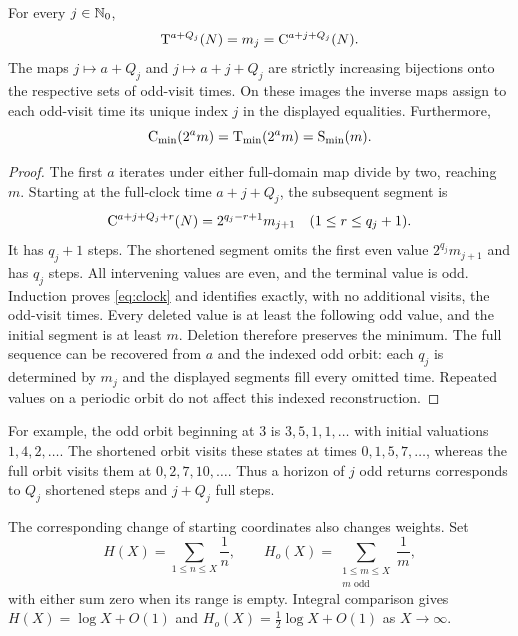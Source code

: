 \begin{proposition}\label{prop:clocks}
For every $j\in\mathbb N_0$,
\begin{equation}\label{eq:clock}
 \mathrm T^{a+Q_j}(N)=m_j=\mathrm C^{a+j+Q_j}(N).
\end{equation}
The maps $j\mapsto a+Q_j$ and $j\mapsto a+j+Q_j$ are strictly
increasing bijections onto the respective sets of odd-visit times.
On these images the inverse maps assign to each odd-visit time its unique
index $j$ in the displayed equalities.
Furthermore,
\begin{equation}\label{eq:min}
 \mathrm C_{\min}(2^a m)=\mathrm T_{\min}(2^a m)=\mathrm S_{\min}(m).
\end{equation}
\end{proposition}
\begin{proof}
The first $a$ iterates under either full-domain map divide by two, reaching
$m$.  Starting at the full-clock time $a+j+Q_j$, the subsequent segment is
\[
 \mathrm C^{a+j+Q_j+r}(N)=2^{q_j-r+1}m_{j+1}
 \quad(1\leq r\leq q_j+1).
\]
It has $q_j+1$ steps.  The shortened segment omits the first even value
$2^{q_j}m_{j+1}$ and has $q_j$ steps.  All intervening values are even,
and the terminal value is odd.  Induction proves \eqref{eq:clock} and
identifies exactly, with no additional visits, the odd-visit times.
Every deleted value is at least the following odd value, and the initial
segment is at least $m$.  Deletion therefore preserves the minimum.
The full sequence can be recovered from $a$ and the indexed odd orbit:
each $q_j$ is determined by $m_j$ and the displayed segments fill every
omitted time.  Repeated values on a periodic orbit do not affect this
indexed reconstruction.
\end{proof}

For example, the odd orbit beginning at $3$ is $3,5,1,1,\ldots$ with
initial valuations $1,4,2,\ldots$.  The shortened orbit visits these
states at times $0,1,5,7,\ldots$, whereas the full orbit visits them at
$0,2,7,10,\ldots$.  Thus a horizon of $j$ odd returns corresponds to
$Q_j$ shortened steps and $j+Q_j$ full steps.

The corresponding change of starting coordinates also changes weights.
Set
\[
 H(X)=\sum_{1\leq n\leq X}\frac1n,\qquad
 H_o(X)=\sum_{\substack{1\leq m\leq X\\m\text{ odd}}}\frac1m,
\]
with either sum zero when its range is empty.  Integral comparison gives
$H(X)=\log X+O(1)$ and $H_o(X)=\frac12\log X+O(1)$ as $X\to\infty$.

